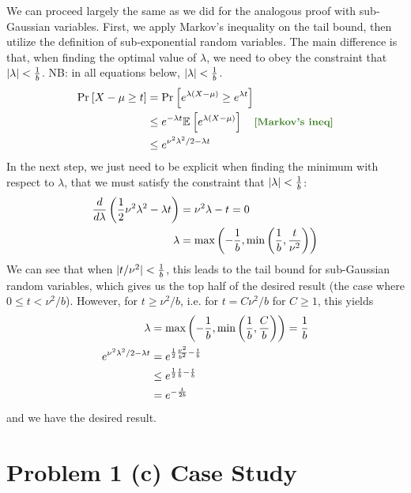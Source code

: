 \documentclass[11pt]{article}
\newcommand{\1}{\mathbb{I}} %
\begin{document}
We can proceed largely the same as we did for the analogous proof with sub-Gaussian variables. First, we apply Markov's inequality on the tail bound, then utilize the definition of sub-exponential random variables. The main difference is that, when finding the optimal value of $\lambda$, we need to obey the constraint that $|\lambda| < \frac{1}{b}$. NB: in all equations below, $|\lambda| < \frac{1}{b}$.
\begin{align}
	\Prob{X - \mu \geq t} 
		&= \Prob{e^{\lambda(X - \mu)}    \geq e^{\lambda t}  }  \\
		&\leq e^{-\lambda t} \E{e^{\lambda (X - \mu) } } \quad \mtgreen{[Markov's ineq]} \\
		&\leq e^{\nu^2 \lambda^2 / 2 - \lambda t}
\end{align}
In the next step, we just need to be explicit when finding the minimum with respect to $\lambda$, that we must satisfy the constraint that $|\lambda| < \frac{1}{b}$:
\begin{align}
	\frac{d}{d\lambda} \left(  \frac{1}{2} \nu^2 \lambda^2 - \lambda t  \right) 
		&= \nu^2 \lambda - t = 0 \\
	\lambda 
		&= \text{max}\left( 
			- \frac{1}{b}, \text{min}\left(  
				\frac{1}{b}, \frac{t}{\nu^2}
		 \right)
		 \right)
\end{align}
We can see that when $|t/\nu^2| < \frac{1}{b}$, this leads to the tail bound for sub-Gaussian random variables, which gives us the top half of the desired result (the case where $0 \leq t < \nu^2 /b$). However, for $t \geq \nu^2/b$, i.e. for $t = C \nu^2/b$ for $C \geq 1$, this yields
\begin{align}
		\lambda 
	&= \text{max}\left( 
		- \frac{1}{b}, \text{min}\left(  
			\frac{1}{b}, \frac{C}{b}
		 \right)
	 \right)
	= \frac{1}{b} \\
	e^{\nu^2 \lambda^2 / 2 - \lambda t}
	&= e^{\frac{1}{2} \frac{\nu^2}{b^2} - \frac{t}{b}} \\
	&\leq e^{\frac{1}{2} \frac{t}{b} - \frac{t}{b}} \\
	&= e^{-\frac{t}{2b}}
\end{align}
and we have the desired result.



\clearpage
\section*{Problem 1 (c) Case Study}
\end{document}
